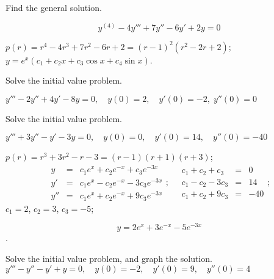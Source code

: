 \documentclass{ximera}
\begin{document}
\begin{problem}\label{exer:9.2.14}  Find the general solution.

$$y^{(4)}-4y'''+7y''-6y'+2y=0$$

\begin{solution}
$p(r)=r^4-4r^3+7r^2-6r+2=(r-1)^2(r^2-2r+2)$;
$y=e^x(c_1+c_2x+c_3\cos x+c_4\sin x)$.
\end{solution}
\end{problem}


\begin{problem}\label{exer:9.2.15}
Solve the
initial value problem.

$y'''-2y''+4y'-8y=0, \quad  y(0)=2,\quad y'(0)=-2,\;  y''(0)=0$
\end{problem}

\begin{problem}\label{exer:9.2.16}  Solve the
initial value problem.

$y'''+3y''-y'-3y=0, \quad  y(0)=0,\quad y'(0)=14,\quad y''(0)=-40$

\begin{solution}
$p(r)=r^3+3r^2-r-3=(r-1)(r+1)(r+3)$;
$$
\begin{array}{lcl}
y&=&c_1e^x+c_2e^{-x}+c_3e^{-3x}\\
y'&=&c_1e^x-c_2e^{-x}-3c_3e^{-3x}\\
y''&=&c_1e^x+c_2e^{-x}+9c_3e^{-3x}
\end{array};\quad
\begin{array}{rcr}
c_1+c_2+c_3&=&0\\
c_1-c_2-3c_3&=&14\\
c_1+c_2+9c_3&=&-40
\end{array};
$$
$c_1=2$, $c_2=3$, $c_3=-5$;

 $$y=2e^x+3e^{-x}-5e^{-3x}$$.
\end{solution}
\end{problem}

\begin{problem}\label{exer:9.2.17} Solve the
initial value problem, and graph the solution.
$y'''-y''-y'+y=0, \quad  y(0)=-2,\quad y'(0)=9,\quad y''(0)=4$
\end{problem}
\end{document}
